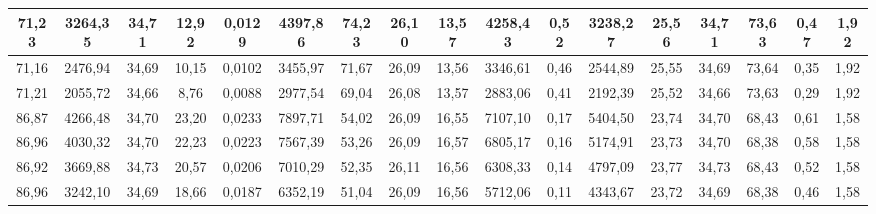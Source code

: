 \begin{table}[H]
{\begin{tabular}{|c|c|c|c|c|c|c|c|c|c|c|c|c|c|c|c|c|}
71,23                     & 3264,35           & 34,71          & 12,92             & 0,0129            & 4397,86           & 74,23                & 26,10             & 13,57            & 4258,43          & 0,52           & 3238,27            & 25,56          & 34,71            & 73,63                  & 0,47               & 1,92          \\ \hline
71,16                     & 2476,94           & 34,69          & 10,15             & 0,0102            & 3455,97           & 71,67                & 26,09             & 13,56            & 3346,61          & 0,46           & 2544,89            & 25,55          & 34,69            & 73,64                  & 0,35               & 1,92          \\ \hline
71,21                     & 2055,72           & 34,66          & 8,76              & 0,0088            & 2977,54           & 69,04                & 26,08             & 13,57            & 2883,06          & 0,41           & 2192,39            & 25,52          & 34,66            & 73,63                  & 0,29               & 1,92          \\ \hline
\rowcolor[HTML]{C0E6F5} 
86,87                     & 4266,48           & 34,70          & 23,20             & 0,0233            & 7897,71           & 54,02                & 26,09             & 16,55            & 7107,10          & 0,17           & 5404,50            & 23,74          & 34,70            & 68,43                  & 0,61               & 1,58          \\ \hline
86,96                     & 4030,32           & 34,70          & 22,23             & 0,0223            & 7567,39           & 53,26                & 26,09             & 16,57            & 6805,17          & 0,16           & 5174,91            & 23,73          & 34,70            & 68,38                  & 0,58               & 1,58          \\ \hline
86,92                     & 3669,88           & 34,73          & 20,57             & 0,0206            & 7010,29           & 52,35                & 26,11             & 16,56            & 6308,33          & 0,14           & 4797,09            & 23,77          & 34,73            & 68,43                  & 0,52               & 1,58          \\ \hline
86,96                     & 3242,10           & 34,69          & 18,66             & 0,0187            & 6352,19           & 51,04                & 26,09             & 16,56            & 5712,06          & 0,11           & 4343,67            & 23,72          & 34,69            & 68,38                  & 0,46               & 1,58          \\ \hline

\end{tabular}}
\end{table}

